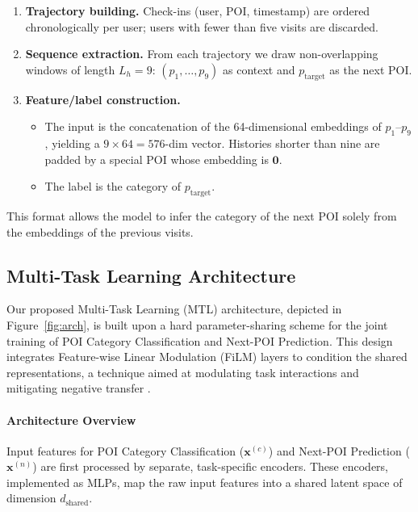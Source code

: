 \begin{enumerate}
  \item \textbf{Trajectory building.}  Check-ins (user, POI, timestamp) are ordered chronologically per user; users with fewer than five visits are discarded.
  \item \textbf{Sequence extraction.}  From each trajectory we draw non-overlapping windows of length $L_h\!=\!9$: $(p_1,\dots,p_9)$ as context and $p_{\text{target}}$ as the next POI.
  \item \textbf{Feature/label construction.}
    \begin{itemize}
      \item The input is the concatenation of the 64-dimensional embeddings of $p_1$–$p_9$, yielding a $9\!\times\!64=576$-dim vector.  
            Histories shorter than nine are padded by a special POI whose embedding is $\mathbf{0}$.
      \item The label is the category of $p_{\text{target}}$.
    \end{itemize}
\end{enumerate}

This format allows the model to infer the category of the next POI solely from the embeddings of the previous visits.

%
%
\subsection{Multi-Task Learning Architecture}
\label{sec:method:mtl}

Our proposed Multi-Task Learning (MTL) architecture, depicted in Figure~\ref{fig:arch}, is built upon a hard parameter-sharing scheme for the joint training of POI Category Classification and Next-POI Prediction. This design integrates Feature-wise Linear Modulation (FiLM) layers to condition the shared representations, a technique aimed at modulating task interactions and mitigating negative transfer \cite{perez2018film, standley2020tasks}.

\paragraph*{Architecture Overview}
Input features for POI Category Classification ($\mathbf{x}^{(c)}$) and Next-POI Prediction ($\mathbf{x}^{(n)}$) are first processed by separate, task-specific encoders. These encoders, implemented as MLPs, map the raw input features into a shared latent space of dimension $d_{\mathrm{shared}}$.

